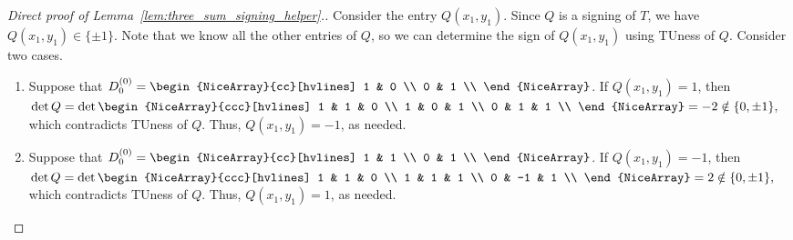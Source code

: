 \documentclass{article}
\theoremstyle{definition}
\begin{document}
\begin{proof}[Direct proof of Lemma~\ref{lem:three_sum_signing_helper}.]
    Consider the entry $Q (x_{1}, y_{1})$. Since $Q$ is a signing of $T$, we have $Q (x_{1}, y_{1}) \in \{\pm 1\}$. Note that we know all the other entries of $Q$, so we can determine the sign of $Q (x_{1}, y_{1})$ using TUness of $Q$. Consider two cases.
    \begin{enumerate}
        \item Suppose that $D_{0}^{(0)} = \begin{NiceArray}{cc}[hvlines] 1 & 0 \\ 0 & 1 \\ \end{NiceArray}$. If $Q (x_{1}, y_{1}) = 1$, then
        $
            \det Q = \det \begin{NiceArray}{ccc}[hvlines]
                1 & 1 & 0 \\
                1 & 0 & 1 \\
                0 & 1 & 1 \\
            \end{NiceArray} = -2 \notin \{0, \pm 1\},
        $
        which contradicts TUness of $Q$. Thus, $Q (x_{1}, y_{1}) = -1$, as needed.
        \item Suppose that $D_{0}^{(0)} = \begin{NiceArray}{cc}[hvlines] 1 & 1 \\ 0 & 1 \\ \end{NiceArray}$. If $Q (x_{1}, y_{1}) = -1$, then
        $
            \det Q = \det \begin{NiceArray}{ccc}[hvlines]
                1 & 1 & 0 \\
                1 & 1 & 1 \\
                0 & -1 & 1 \\
            \end{NiceArray} = 2 \notin \{0, \pm 1\},
        $
        which contradicts TUness of $Q$. Thus, $Q (x_{1}, y_{1}) = 1$, as needed.
    \end{enumerate}
\end{proof}
\end{document}
